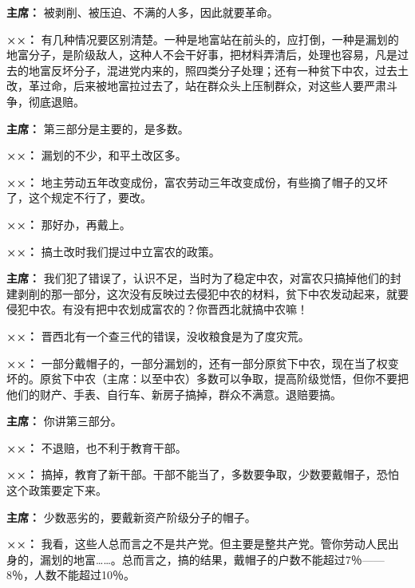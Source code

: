 \begin{duihua}
\item[\textbf{主席：}] 被剥削、被压迫、不满的人多，因此就要革命。

\item[\textbf{××：}] 有几种情况要区别清楚。一种是地富站在前头的，应打倒，一种是漏划的地富分子，是阶级敌人，这种人不会干好事，把材料弄清后，处理也容易，凡是过去的地富反坏分子，混进党内来的，照四类分子处理；还有一种贫下中农，过去土改，革过命，后来被地富拉过去了，站在群众头上压制群众，对这些人要严肃斗争，彻底退赔。

\item[\textbf{主席：}] 第三部分是主要的，是多数。

\item[\textbf{××：}] 漏划的不少，和平土改区多。

\item[\textbf{××：}] 地主劳动五年改变成份，富农劳动三年改变成份，有些摘了帽子的又坏了，这个规定不行了，要改。

\item[\textbf{××：}] 那好办，再戴上。

\item[\textbf{××：}] 搞土改时我们提过中立富农的政策。

\item[\textbf{主席：}] 我们犯了错误了，认识不足，当时为了稳定中农，对富农只搞掉他们的封建剥削的那一部分，这次没有反映过去侵犯中农的材料，贫下中农发动起来，就要侵犯中农。有没有把中农划成富农的？你晋西北就搞中农嘛！

\item[\textbf{××：}] 晋西北有一个查三代的错误，没收粮食是为了度灾荒。

\item[\textbf{××：}] 一部分戴帽子的，一部分漏划的，还有一部分原贫下中农，现在当了权变坏的。原贫下中农（主席：以至中农）多数可以争取，提高阶级觉悟，但你不要把他们的财产、手表、自行车、新房子搞掉，群众不满意。退赔要搞。

\item[\textbf{主席：}] 你讲第三部分。

\item[\textbf{××：}] 不退赔，也不利于教育干部。

\item[\textbf{××：}] 搞掉，教育了新干部。干部不能当了，多数要争取，少数要戴帽子，恐怕这个政策要定下来。

\item[\textbf{主席：}] 少数恶劣的，要戴新资产阶级分子的帽子。

\item[\textbf{××：}] 我看，这些人总而言之不是共产党。但主要是整共产党。管你劳动人民出身的，漏划的地富……。总而言之，搞的结果，戴帽子的户数不能超过7％——8％，人数不能超过10％。


\end{duihua}
